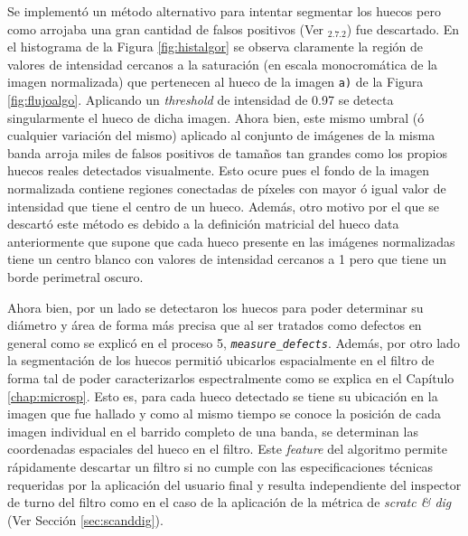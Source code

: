 \begin{enumerate}
\hspace{0.5cm}Se implementó un método alternativo para intentar segmentar los huecos pero como arrojaba una gran cantidad de falsos positivos (Ver \href{https://github.com/jrr1984/defects_analysis/blob/master/find_contours_holes_trial.py}{\faGithub$_{2.7.2}$}) fue descartado. En el histograma de la Figura \ref{fig:histalgor} se observa claramente la región de valores de intensidad cercanos a la saturación (en escala monocromática de la imagen normalizada) que pertenecen al hueco de la imagen \texttt{a)} de la Figura \ref{fig:flujoalgo}. Aplicando un \textit{threshold} de intensidad de 0.97 se detecta singularmente el hueco de dicha imagen. Ahora bien, este mismo umbral (ó cualquier variación del mismo) aplicado al conjunto de imágenes de la misma banda arroja miles de falsos positivos de tamaños tan grandes como los propios huecos reales detectados visualmente. Esto ocure pues el fondo de la imagen normalizada contiene regiones conectadas de píxeles con mayor ó igual valor de intensidad que tiene el centro de un hueco. Además, otro motivo por el que se descartó este método es debido a la definición matricial del hueco data anteriormente que supone que cada hueco presente en las imágenes normalizadas tiene un centro blanco con valores de intensidad cercanos a 1 pero que tiene un borde perimetral oscuro.

\hspace{0.5cm}Ahora bien, por un lado se detectaron los huecos para poder determinar su diámetro y área de forma más precisa que al ser tratados como defectos en general como se explicó en el proceso 5, \texttt{\textit{measure\_defects}}. Además, por otro lado la segmentación de los huecos permitió ubicarlos espacialmente en el filtro de forma tal de poder caracterizarlos espectralmente como se explica en el Capítulo \ref{chap:microsp}. Esto es, para cada hueco detectado se tiene su ubicación en la imagen que fue hallado y como al mismo tiempo se conoce la posición de cada imagen individual en el barrido completo de una banda, se determinan las coordenadas espaciales del hueco en el filtro. Este \textit{feature} del algoritmo permite rápidamente descartar un filtro si no cumple con las especificaciones técnicas requeridas por la aplicación del usuario final y resulta independiente del inspector de turno del filtro como en el caso de la aplicación de la métrica de \textit{scratc \& dig} (Ver Sección \ref{sec:scanddig}).


\end{enumerate}
